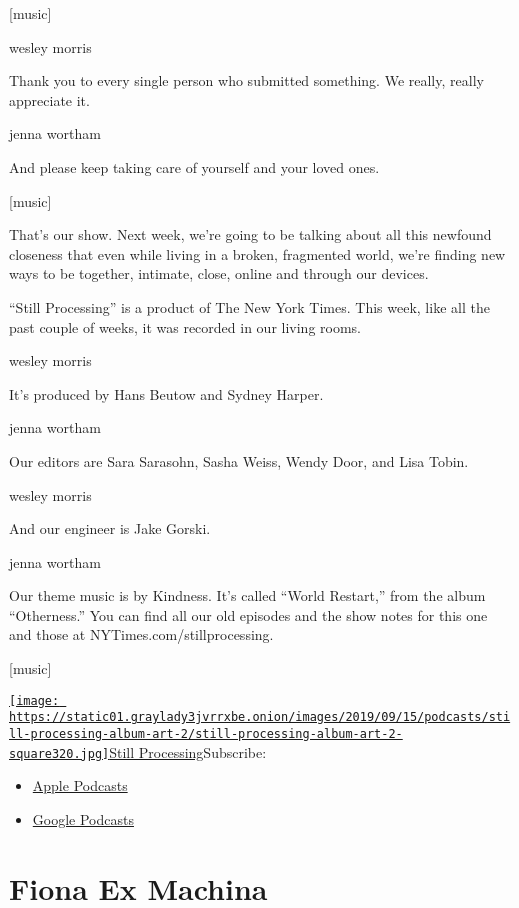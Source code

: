 {[}music{]}

wesley morris

Thank you to every single person who submitted something. We really,
really appreciate it.

jenna wortham

And please keep taking care of yourself and your loved ones.

{[}music{]}

That's our show. Next week, we're going to be talking about all this
newfound closeness that even while living in a broken, fragmented world,
we're finding new ways to be together, intimate, close, online and
through our devices.

``Still Processing'' is a product of The New York Times. This week, like
all the past couple of weeks, it was recorded in our living rooms.

wesley morris

It's produced by Hans Beutow and Sydney Harper.

jenna wortham

Our editors are Sara Sarasohn, Sasha Weiss, Wendy Door, and Lisa Tobin.

wesley morris

And our engineer is Jake Gorski.

jenna wortham

Our theme music is by Kindness. It's called ``World Restart,'' from the
album ``Otherness.'' You can find all our old episodes and the show
notes for this one and those at NYTimes.com/stillprocessing.

{[}music{]}

\href{https://www.nytimes3xbfgragh.onion/column/still-processing-podcast}{\texttt{[image: https://static01.graylady3jvrrxbe.onion/images/2019/09/15/podcasts/still-processing-album-art-2/still-processing-album-art-2-square320.jpg]}Still
Processing}Subscribe:

\begin{itemize}
\tightlist
\item
  \href{https://itunes.apple.com/us/podcast/id1151436460}{Apple
  Podcasts}
\item
  \href{https://www.google.com/podcasts?feed=aHR0cHM6Ly9yc3MuYXJ0MTkuY29tL255dC1zdGlsbC1wcm9jZXNzaW5n}{Google
  Podcasts}
\end{itemize}

\hypertarget{fiona-ex-machina-1}{%
\section{Fiona Ex Machina}\label{fiona-ex-machina-1}}

